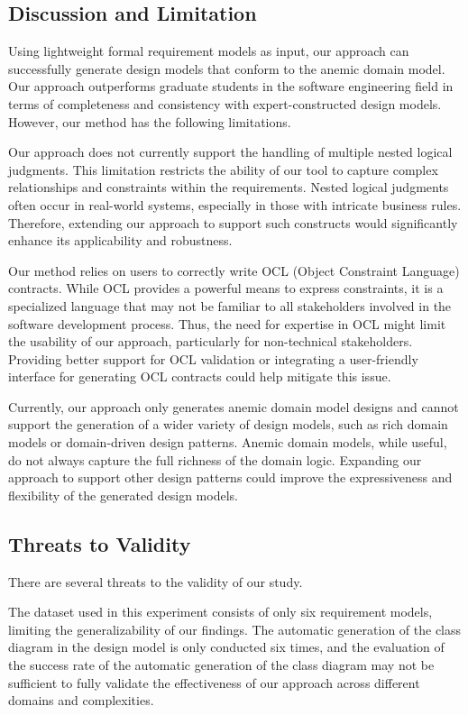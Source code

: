 \documentclass[pdflatex,sn-mathphys-num]{sn-jnl}%
\theoremstyle{thmstyleone}%
\theoremstyle{thmstyletwo}%
\theoremstyle{thmstylethree}%
\begin{document}
\subsection{Discussion and Limitation}

Using lightweight formal requirement models as input, our approach can successfully generate design models that conform to the anemic domain model. Our approach outperforms graduate students in the software engineering field in terms of completeness and consistency with expert-constructed design models. However, our method has the following limitations.

Our approach does not currently support the handling of multiple nested logical judgments. This limitation restricts the ability of our tool to capture complex relationships and constraints within the requirements. Nested logical judgments often occur in real-world systems, especially in those with intricate business rules. Therefore, extending our approach to support such constructs would significantly enhance its applicability and robustness.

Our method relies on users to correctly write OCL (Object Constraint Language) contracts. While OCL provides a powerful means to express constraints, it is a specialized language that may not be familiar to all stakeholders involved in the software development process. Thus, the need for expertise in OCL might limit the usability of our approach, particularly for non-technical stakeholders. Providing better support for OCL validation or integrating a user-friendly interface for generating OCL contracts could help mitigate this issue.

Currently, our approach only generates anemic domain model designs and cannot support the generation of a wider variety of design models, such as rich domain models or domain-driven design patterns. Anemic domain models, while useful, do not always capture the full richness of the domain logic. Expanding our approach to support other design patterns could improve the expressiveness and flexibility of the generated design models.


\subsection{Threats to Validity}

There are several threats to the validity of our study.

The dataset used in this experiment consists of only six requirement models, limiting the generalizability of our findings. The automatic generation of the class diagram in the design model is only conducted six times, and the evaluation of the success rate of the automatic generation of the class diagram may not be sufficient to fully validate the effectiveness of our approach across different domains and complexities.
\end{document}
